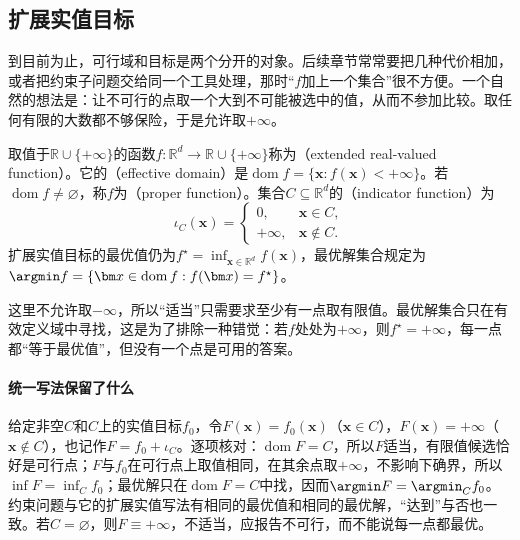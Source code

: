 \subsection{扩展实值目标}
\label{sec:opt-prob-extended-value}

到目前为止，可行域和目标是两个分开的对象。后续章节常常要把几种代价相加，或者把约束子问题交给同一个工具处理，那时“$f$加上一个集合”很不方便。一个自然的想法是：让不可行的点取一个大到不可能被选中的值，从而不参加比较。取任何有限的大数都不够保险，于是允许取$+\infty$。

\begin{definition}
\label{def:opt-prob-extended}
取值于$\mathbb R\cup\{+\infty\}$的函数$f:\mathbb R^d\to\mathbb R\cup\{+\infty\}$称为（extended real-valued function）。它的（effective domain）是$\operatorname{dom}f=\{\bm x:f(\bm x)<+\infty\}$。若$\operatorname{dom}f\neq\varnothing$，称$f$为（proper function）。集合$C\subseteq\mathbb R^d$的（indicator function）为
\[
  \iota_C(\bm x)=\begin{cases}0,&\bm x\in C,\\+\infty,&\bm x\notin C.\end{cases}
\]
扩展实值目标的最优值仍为$f^\star=\inf_{\bm x\in\mathbb R^d}f(\bm x)$，最优解集合规定为$\argmin f=\{\bm x\in\operatorname{dom}f:f(\bm x)=f^\star\}$。
\end{definition}

这里不允许取$-\infty$，所以“适当”只需要求至少有一点取有限值。最优解集合只在有效定义域中寻找，这是为了排除一种错觉：若$f$处处为$+\infty$，则$f^\star=+\infty$，每一点都“等于最优值”，但没有一个点是可用的答案。

\paragraph{统一写法保留了什么}
给定非空$C$和$C$上的实值目标$f_0$，令$F(\bm x)=f_0(\bm x)$（$\bm x\in C$），$F(\bm x)=+\infty$（$\bm x\notin C$），也记作$F=f_0+\iota_C$。逐项核对：$\operatorname{dom}F=C$，所以$F$适当，有限值候选恰好是可行点；$F$与$f_0$在可行点上取值相同，在其余点取$+\infty$，不影响下确界，所以$\inf F=\inf_Cf_0$；最优解只在$\operatorname{dom}F=C$中找，因而$\argmin F=\argmin_Cf_0$。约束问题与它的扩展实值写法有相同的最优值和相同的最优解，“达到”与否也一致。若$C=\varnothing$，则$F\equiv+\infty$，不适当，应报告不可行，而不能说每一点都最优。

